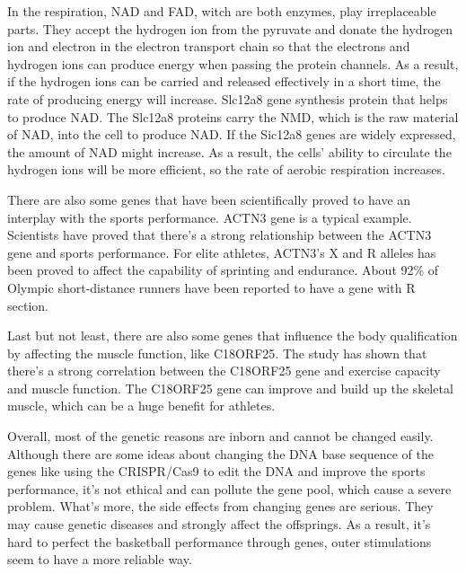 \documentclass[man,floatsintext]{apa7}
\begin{document}
In the respiration, NAD and FAD, witch are both enzymes, play irreplaceable parts. They accept the hydrogen ion from the pyruvate and donate the hydrogen ion and electron in the electron transport chain so that the electrons and hydrogen ions can produce energy when passing the protein channels. As a result, if the hydrogen ions can be carried and released effectively in a short time, the rate of producing energy will increase. Slc12a8 gene synthesis protein that helps to produce NAD. The Slc12a8 proteins carry the NMD, which is the raw material of NAD, into the cell to produce NAD. \autocite{grozioSlc12a8NicotinamideMononucleotide2019} If the Sic12a8 genes are widely expressed, the amount of NAD might increase. As a result, the cells' ability to circulate the hydrogen ions will be more efficient, so the rate of aerobic respiration increases.

There are also some genes that have been scientifically proved to have an interplay with the sports performance. ACTN3 gene is a typical example. Scientists have proved that there's a strong relationship between the ACTN3 gene and sports performance. For elite athletes, ACTN3's X and R alleles has been proved to affect the capability of sprinting and endurance. About 92\% of Olympic short-distance runners have been reported to have a gene with R section.\autocite{goelACTN3AthleteGene2007}

Last but not least, there are also some genes that influence the body qualification by affecting the muscle function, like C18ORF25. The study has shown that there's a strong correlation between the C18ORF25 gene and exercise capacity and muscle function. The C18ORF25 gene can improve and build up the skeletal muscle, which can be a huge benefit for athletes.\autocite{blazevPhosphoproteomicsThreeExercise2022}

Overall, most of the genetic reasons are inborn and cannot be changed easily. Although there are some ideas about changing the DNA base sequence of the genes like using the CRISPR/Cas9 to edit the DNA and improve the sports performance, it's not ethical and can pollute the gene pool, which cause a severe problem. What's more, the side effects from changing genes are serious. They may cause genetic diseases and strongly affect the offsprings. As a result, it's hard to perfect the basketball performance through genes, outer stimulations seem to have a more reliable way. 
\end{document}

